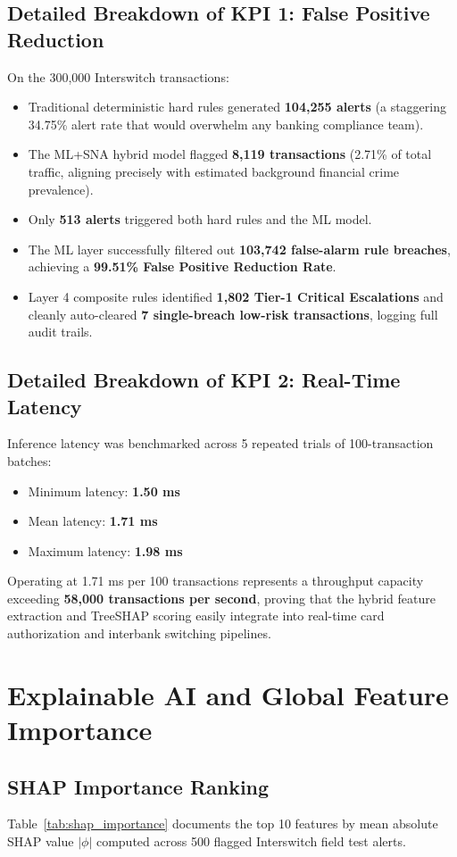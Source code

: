 \subsection{Detailed Breakdown of KPI 1: False Positive Reduction}
On the 300,000 Interswitch transactions:
\begin{itemize}
    \item Traditional deterministic hard rules generated \textbf{104,255 alerts} (a staggering 34.75\% alert rate that would overwhelm any banking compliance team).
    \item The ML+SNA hybrid model flagged \textbf{8,119 transactions} (2.71\% of total traffic, aligning precisely with estimated background financial crime prevalence).
    \item Only \textbf{513 alerts} triggered both hard rules and the ML model.
    \item The ML layer successfully filtered out \textbf{103,742 false-alarm rule breaches}, achieving a \textbf{99.51\% False Positive Reduction Rate}.
    \item Layer 4 composite rules identified \textbf{1,802 Tier-1 Critical Escalations} and cleanly auto-cleared \textbf{7 single-breach low-risk transactions}, logging full audit trails.
\end{itemize}

\subsection{Detailed Breakdown of KPI 2: Real-Time Latency}
Inference latency was benchmarked across 5 repeated trials of 100-transaction batches:
\begin{itemize}
    \item Minimum latency: \textbf{1.50 ms}
    \item Mean latency: \textbf{1.71 ms}
    \item Maximum latency: \textbf{1.98 ms}
\end{itemize}
Operating at 1.71 ms per 100 transactions represents a throughput capacity exceeding \textbf{58,000 transactions per second}, proving that the hybrid feature extraction and TreeSHAP scoring easily integrate into real-time card authorization and interbank switching pipelines.

\section{Explainable AI and Global Feature Importance}
\subsection{SHAP Importance Ranking}
Table~\ref{tab:shap_importance} documents the top 10 features by mean absolute SHAP value $|\phi|$ computed across 500 flagged Interswitch field test alerts.

